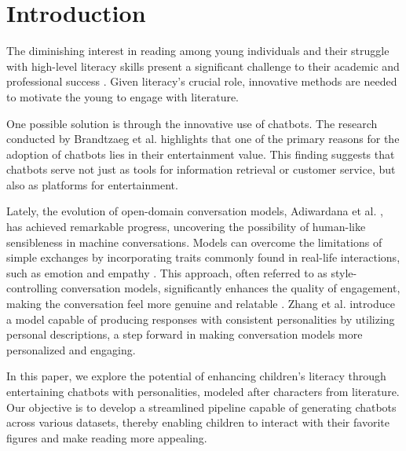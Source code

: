 \documentclass[fleqn,moreauthors,10pt]{ds_report}
\affiliation{\textit{Advisors: Slavko Žitnik}}
\begin{document}
\flushbottom 

\maketitle 


\section*{Introduction}

The diminishing interest in reading among young individuals and their struggle with high-level literacy skills present a significant challenge to their academic and professional success \cite{murray2021literacy}. Given literacy's crucial role, innovative methods are needed to motivate the young to engage with literature.

One possible solution is through the innovative use of chatbots. The research conducted by Brandtzaeg et al. \cite{why_chatbots} highlights that one of the primary reasons for the adoption of chatbots lies in their entertainment value. This finding suggests that chatbots serve not just as tools for information retrieval or customer service, but also as platforms for entertainment.

Lately, the evolution of open-domain conversation models, Adiwardana et al. \cite{adiwardana2020towards}, has achieved remarkable progress, uncovering the possibility of human-like sensibleness in machine conversations. Models can overcome the limitations of simple exchanges by incorporating traits commonly found in real-life interactions, such as emotion \cite{zhou2018emotional} and empathy \cite{rashkin2018towards_empathy}. This approach, often referred to as style-controlling conversation models, significantly enhances the quality of engagement, making the conversation feel more genuine and relatable \cite{smith2020controlling}. Zhang et al. \cite{zhang2018personalizing} introduce a model capable of producing responses with consistent personalities by utilizing personal descriptions, a step forward in making conversation models more personalized and engaging.

In this paper, we explore the potential of enhancing children's literacy through entertaining chatbots with personalities, modeled after characters from literature. Our objective is to develop a streamlined pipeline capable of generating chatbots across various datasets, thereby enabling children to interact with their favorite figures and make reading more appealing.
\end{document}
